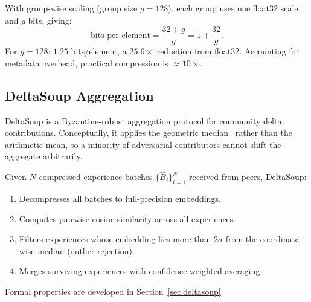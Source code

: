 With group-wise scaling (group size $g = 128$), each group uses one float32
scale and $g$ bits, giving:
\begin{equation}
    \text{bits per element} = \frac{32 + g}{g} = 1 + \frac{32}{g}.
\end{equation}
For $g = 128$: $1.25$ bits/element, a $25.6\times$ reduction from float32.
Accounting for metadata overhead, practical compression is ${\approx}10\times$.

\subsection{DeltaSoup Aggregation}
\label{sec:background-deltasoup}

DeltaSoup is a Byzantine-robust aggregation protocol for community delta
contributions. Conceptually, it applies the geometric median~\cite{minsker2015geometric}
rather than the arithmetic mean, so a minority of adversarial contributors
cannot shift the aggregate arbitrarily.

Given $N$ compressed experience batches $\{\hat{B}_i\}_{i=1}^N$ received from
peers, DeltaSoup:
\begin{enumerate}[leftmargin=1.5em]
    \item Decompresses all batches to full-precision embeddings.
    \item Computes pairwise cosine similarity across all experiences.
    \item Filters experiences whose embedding lies more than $2\sigma$ from
          the coordinate-wise median (outlier rejection).
    \item Merges surviving experiences with confidence-weighted averaging.
\end{enumerate}

Formal properties are developed in Section~\ref{sec:deltasoup}.

